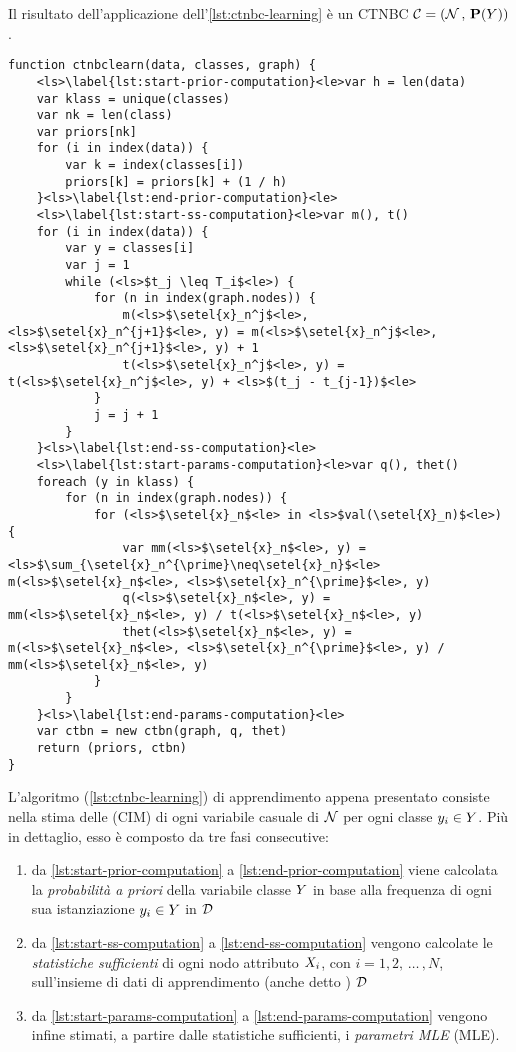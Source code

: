 Il risultato dell'applicazione dell'\autoref{lst:ctnbc-learning} è un \acl{CTNBC} $\mathcal{C}=(\mathcal{N}\,,\,\mathbf{P}(\mathnormal{Y}))$.
\begin{lstlisting}[caption=Apprendimento di un classificatore \acs{CTNB}, label=lst:ctnbc-learning, language=pseudo]
function ctnbclearn(data, classes, graph) {
    <ls>\label{lst:start-prior-computation}<le>var h = len(data)
    var klass = unique(classes)
    var nk = len(class)
    var priors[nk]
    for (i in index(data)) {
        var k = index(classes[i])
        priors[k] = priors[k] + (1 / h)
    }<ls>\label{lst:end-prior-computation}<le>
    <ls>\label{lst:start-ss-computation}<le>var m(), t()
    for (i in index(data)) {
        var y = classes[i]
        var j = 1
        while (<ls>$t_j \leq T_i$<le>) {
            for (n in index(graph.nodes)) {
                m(<ls>$\setel{x}_n^j$<le>, <ls>$\setel{x}_n^{j+1}$<le>, y) = m(<ls>$\setel{x}_n^j$<le>, <ls>$\setel{x}_n^{j+1}$<le>, y) + 1
                t(<ls>$\setel{x}_n^j$<le>, y) = t(<ls>$\setel{x}_n^j$<le>, y) + <ls>$(t_j - t_{j-1})$<le>
            }
            j = j + 1
        }
    }<ls>\label{lst:end-ss-computation}<le>
    <ls>\label{lst:start-params-computation}<le>var q(), thet()
    foreach (y in klass) {
        for (n in index(graph.nodes)) {
            for (<ls>$\setel{x}_n$<le> in <ls>$val(\setel{X}_n)$<le>) {
                var mm(<ls>$\setel{x}_n$<le>, y) = <ls>$\sum_{\setel{x}_n^{\prime}\neq\setel{x}_n}$<le> m(<ls>$\setel{x}_n$<le>, <ls>$\setel{x}_n^{\prime}$<le>, y)
                q(<ls>$\setel{x}_n$<le>, y) = mm(<ls>$\setel{x}_n$<le>, y) / t(<ls>$\setel{x}_n$<le>, y)
                thet(<ls>$\setel{x}_n$<le>, y) = m(<ls>$\setel{x}_n$<le>, <ls>$\setel{x}_n^{\prime}$<le>, y) / mm(<ls>$\setel{x}_n$<le>, y)
            }
        }
    }<ls>\label{lst:end-params-computation}<le>
    var ctbn = new ctbn(graph, q, thet)
    return (priors, ctbn)
}
\end{lstlisting}\vspace*{8pt}
L'algoritmo (\ref{lst:ctnbc-learning}) di apprendimento appena presentato consiste nella stima delle \cim{} (\acs{CIM}) di ogni variabile casuale di $\mathcal{N}$ per ogni classe $\mathnormal{y}_i \in \mathnormal{Y}$. Più in dettaglio, esso è composto da tre fasi consecutive:
\begin{enumerate}
    \item da \autoref{lst:start-prior-computation} a \autoref{lst:end-prior-computation} viene calcolata la \emph{probabilità a priori} della variabile classe $\mathnormal{Y}$ in base alla frequenza di ogni sua istanziazione $\mathnormal{y}_i \in\mathnormal{Y}$ in $\mathcal{D}$
    \item da \autoref{lst:start-ss-computation} a \autoref{lst:end-ss-computation} vengono calcolate le \emph{statistiche sufficienti} di ogni nodo attributo $\mathnormal{X}_i$, con $i=1,2,\,\dotsc\,,N$, sull'insieme di dati di apprendimento (anche detto \emph{}) $\mathcal{D}$
    \item da \autoref{lst:start-params-computation} a \autoref{lst:end-params-computation} vengono infine stimati, a partire dalle statistiche sufficienti, i \emph{parametri \acl{MLE}} (\acs{MLE}).
\end{enumerate}
